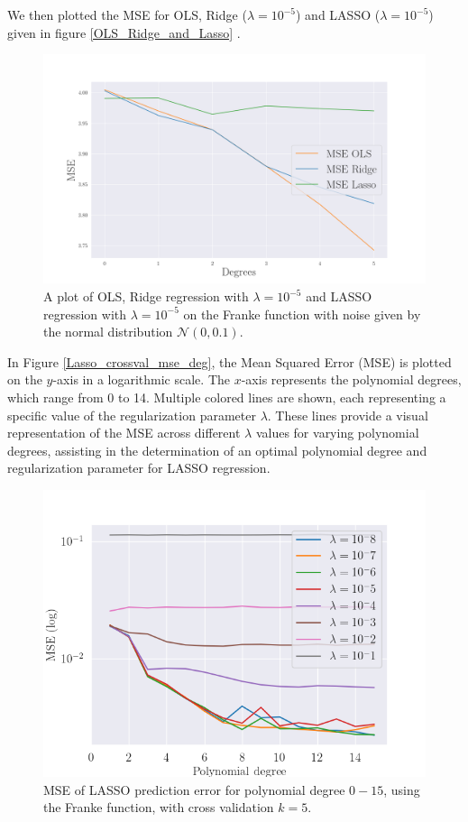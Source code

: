 %
\noindent We then plotted the MSE for OLS, Ridge ($\lambda = 10^{-5}$) and LASSO ($\lambda = 10^{-5}$) given in figure \eqref{OLS_Ridge_and_Lasso} . 
%
\begin{figure}[H]
	\centering
	\includegraphics[width=\linewidth]{images/MSE_for_OLS_Ridge_Lasso.png}
	\caption{A plot of OLS, Ridge regression with $\lambda = 10^{-5}$ and LASSO regression with $\lambda = 10^{-5}$ on the Franke function with noise given by the normal distribution $\mathcal{N}(0,0.1)$. }
	\label{OLS_Ridge_and_Lasso}
\end{figure}
%
\noindent In Figure \eqref{Lasso_crossval_mse_deg}, the Mean Squared Error (MSE) is plotted on the $y$-axis in a logarithmic scale. The $x$-axis represents the polynomial degrees, which range from 0 to 14. Multiple colored lines are shown, each representing a specific value of the regularization parameter $\lambda$. These lines provide a visual representation of the MSE across different $\lambda$ values for varying polynomial degrees, assisting in the determination of an optimal polynomial degree and regularization parameter for LASSO regression.
%
\begin{figure}[H]
	\centering
	\includegraphics[width=\linewidth]{images/cv_lasso.png}
	\caption{MSE of LASSO prediction error for polynomial degree $0-15$, using the Franke function, with cross validation $k=5$.}
 \label{Lasso_crossval_mse_deg}
\end{figure}

